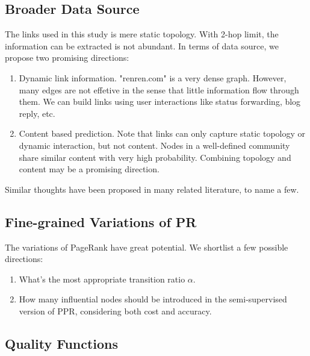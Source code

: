 \documentclass[11pt,a4paper]{article}
\begin{document}
\subsection{Broader Data Source}

The links used in this study is mere static topology. 
With 2-hop limit, the information can be extracted 
is not abundant. In terms of data source, we propose 
two promising directions:
\begin{enumerate}
	\item Dynamic link information. "renren.com" is a very 
	dense graph. However, many edges are not effetive in the sense
	that little information flow through them. We can 
	build links using user interactions like status forwarding, 
	blog reply, etc. 
	\item Content based prediction. Note that links can only capture
	static topology or dynamic interaction, but not content. Nodes in a 
	well-defined community share similar content with very high 
	probability. Combining topology and content may be a promising 
	direction. 
\end{enumerate}

Similar thoughts have been proposed in many related literature, to name 
a few\cite{boccaletti2006complex,aggarwal2011social}. 

\subsection{Fine-grained Variations of PR}

The variations of PageRank have great potential. We
shortlist a few possible directions:
\begin{enumerate}
	\item What's the most appropriate transition ratio $\alpha$. 
	\item How many influential nodes should be introduced 
	in the semi-supervised version of PPR, considering
	both cost and accuracy. 
\end{enumerate}

\subsection{Quality Functions}
\end{document}
